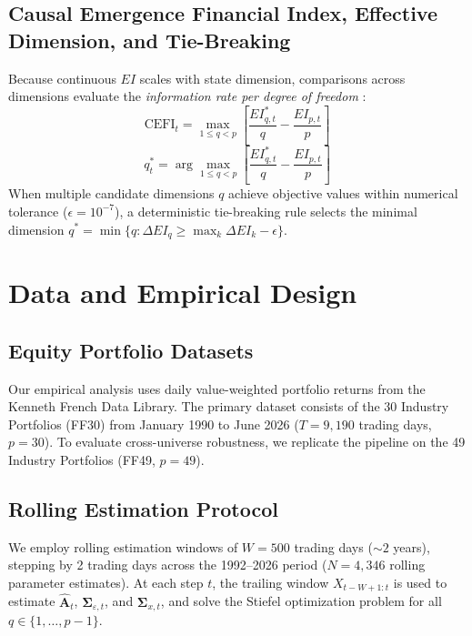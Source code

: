 \documentclass[review,12pt,authoryear]{elsarticle}
\begin{document}
\subsection{Causal Emergence Financial Index, Effective Dimension, and Tie-Breaking}
Because continuous $EI$ scales with state dimension, comparisons across dimensions evaluate the \emph{information rate per degree of freedom} \citep{liu2024exact}:
\begin{equation}
\mathrm{CEFI}_t = \max_{1 \le q < p} \left[ \frac{EI_{q,t}^*}{q} - \frac{EI_{p,t}}{p} \right]
\label{eq:cefi_def}
\end{equation}
\begin{equation}
q_t^* = \arg\max_{1 \le q < p} \left[ \frac{EI_{q,t}^*}{q} - \frac{EI_{p,t}}{p} \right]
\label{eq:q_star_def}
\end{equation}
When multiple candidate dimensions $q$ achieve objective values within numerical tolerance ($\epsilon = 10^{-7}$), a deterministic tie-breaking rule selects the minimal dimension $q^* = \min \{ q : \Delta EI_q \ge \max_{k} \Delta EI_k - \epsilon \}$.

\section{Data and Empirical Design}
\label{sec:data}

\subsection{Equity Portfolio Datasets}
Our empirical analysis uses daily value-weighted portfolio returns from the Kenneth French Data Library. The primary dataset consists of the 30 Industry Portfolios (FF30) from January 1990 to June 2026 ($T = 9,190$ trading days, $p = 30$). To evaluate cross-universe robustness, we replicate the pipeline on the 49 Industry Portfolios (FF49, $p=49$).

\subsection{Rolling Estimation Protocol}
We employ rolling estimation windows of $W = 500$ trading days ($\sim 2$ years), stepping by 2 trading days across the 1992--2026 period ($N = 4,346$ rolling parameter estimates). At each step $t$, the trailing window $X_{t-W+1:t}$ is used to estimate $\hat{\mathbf{A}}_t$, $\boldsymbol{\Sigma}_{\varepsilon,t}$, and $\boldsymbol{\Sigma}_{x,t}$, and solve the Stiefel optimization problem for all $q \in \{1, \dots, p-1\}$.
\end{document}

